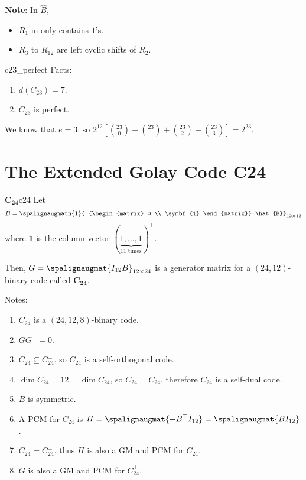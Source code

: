 \textbf{Note}: In $ \hat{B} $,
\begin{itemize}
    \item $ R_1 $ in only contains $ 1 $'s.
    \item $ R_3 $ to $ R_{12} $ are left cyclic shifts of $ R_2 $.
\end{itemize}

\begin{Theorem}{}{c23_perfect}
    Facts:
    \begin{enumerate}
        \item $ d(C_{23})=7 $.
        \item $ C_{23} $ is perfect.
    \end{enumerate}
\end{Theorem}

\begin{Proof}{}{}
    We know that $ e=3 $, so
    $ 2^{12}\left[ \binom{23}{0}+\binom{23}{1}+\binom{23}{2}+\binom{23}{3} \right]=
        2^{23} $.
\end{Proof}

\section{The Extended Golay Code C24}
\begin{Definition}{$ \symbf{C_{24}} $}{c24}
    Let
    \[ B=\spalignaugmatn{1}{
            {\begin{matrix}
                        0 \\
                        \symbf{1}
                    \end{matrix}}
            \hat{B}}_{12\times{} 12}
    \]
    where $ \symbf{1} $ is the column vector $ (\underbrace{1,\ldots ,1}_{11\text{ times}})^\top $.

    Then, $ G=\spalignaugmat{I_{12} B}_{12\times 24} $ is a generator
    matrix for a $ (24,12) $-binary code called $ \symbf{C_{24}} $.
\end{Definition}

Notes:
\begin{enumerate}[label=(\arabic*)]
    \item $ C_{24} $ is a $ (24,12,8) $-binary code.
    \item $ GG^\top=0 $.
    \item $ C_{24}\subseteq C_{24}^\perp $,
          so $ C_{24} $ is a self-orthogonal code.
    \item $ \dim{C_{24}}=12=\dim{C_{24}^\perp} $, so
          $ C_{24}=C_{24}^\perp $, therefore $ C_{24} $ is a self-dual code.
    \item $ B $ is symmetric.
    \item A PCM for $ C_{24} $ is $ H=\spalignaugmat{{-B^\top} I_{12}}=
              \spalignaugmat{B I_{12}} $.
    \item $ C_{24}=C_{24}^\perp $, thus $ H $ is also a GM and PCM for $ C_{24} $.
    \item $ G $ is also a GM and PCM for $ C_{24}^\perp $.
\end{enumerate}

